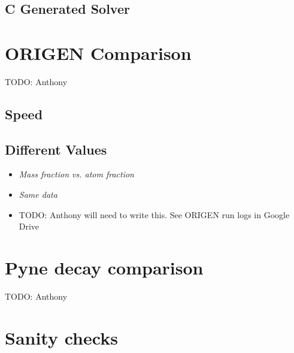 \documentclass{article}
\makeatletter
\newcommand\todo[1]{{\color{red}TODO\@: #1}}
\makeatother
\begin{document}
\subsection{C Generated Solver}
\label{sec:c-solve}


\section{ORIGEN Comparison}
\todo{Anthony}
\subsection{Speed}
\label{sec:origen-speed}

\subsection{Different Values}
\begin{itemize}
\item \it{Mass fraction vs. atom fraction}
\item {\it Same data}
\item \todo{Anthony will need to write this. See ORIGEN run logs in Google Drive}
\end{itemize}

\section{Pyne decay comparison}
\todo{Anthony}

\section{Sanity checks}
\label{sec:sanity-checks}


\clearpage

\end{document}
